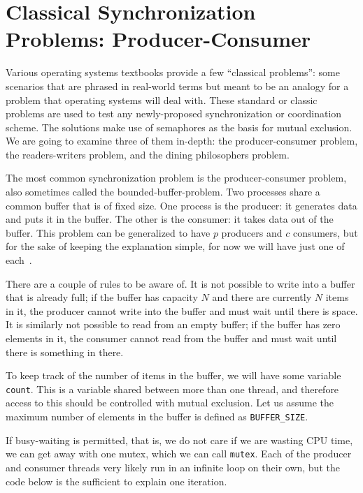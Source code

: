 




\section*{Classical Synchronization Problems: Producer-Consumer}

Various operating systems textbooks provide a few ``classical problems'': some scenarios that are phrased in real-world terms but meant to be an analogy for a problem that operating systems will deal with. These standard or classic problems are used to test any newly-proposed synchronization or coordination scheme. The solutions make use of semaphores as the basis for mutual exclusion. We are going to examine three of them in-depth: the producer-consumer problem, the readers-writers problem, and the dining philosophers problem.

The most common synchronization problem is the producer-consumer problem, also sometimes called the bounded-buffer-problem. Two processes share a common buffer that is of fixed size. One process is the producer: it generates data and puts it in the buffer. The other is the consumer: it takes data out of the buffer. This problem can be generalized to have $p$ producers and $c$ consumers, but for the sake of keeping the explanation simple, for now we will have just one of each~\cite{mos}.

There are a couple of rules to be aware of. It is not possible to write into a buffer that is already full; if the buffer has capacity $N$ and there are currently $N$ items in it, the producer cannot write into the buffer and must wait until there is space. It is similarly not possible to read from an empty buffer; if the buffer has zero elements in it, the consumer cannot read from the buffer and must wait until there is something in there.

To keep track of the number of items in the buffer, we will have some variable \texttt{count}. This is a variable shared between more than one thread, and therefore access to this should be controlled with mutual exclusion. Let us assume the maximum number of elements in the buffer is defined as \texttt{BUFFER\_SIZE}.

If busy-waiting is permitted, that is, we do not care if we are wasting CPU time, we can get away with one mutex, which we can call \texttt{mutex}. Each of the producer and consumer threads very likely run in an infinite loop on their own, but the code below is the sufficient to explain one iteration.

